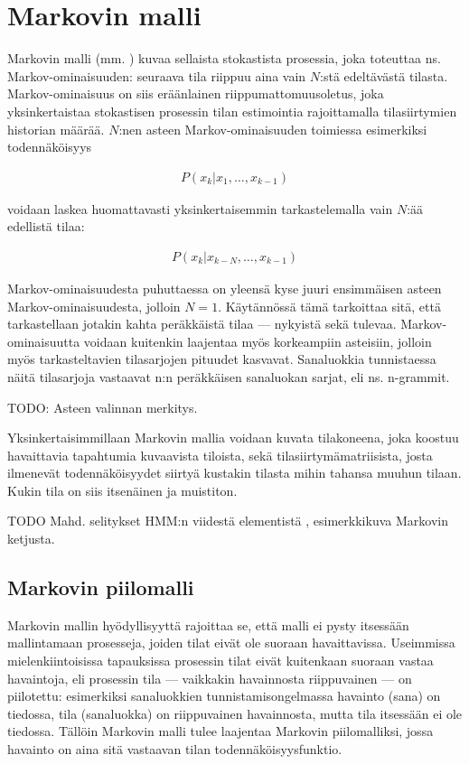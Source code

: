 \documentclass[utf8,bachelor,manualbib]{gradu3}
\begin{document}
\section{Markovin malli}

Markovin malli (mm. \citealp{rabiner1989}) kuvaa sellaista stokastista prosessia, joka toteuttaa ns. Markov-ominaisuuden: seuraava tila riippuu aina vain $N$:stä edeltävästä tilasta. Markov-ominaisuus on siis eräänlainen riippumattomuusoletus, joka yksinkertaistaa stokastisen prosessin tilan estimointia rajoittamalla tilasiirtymien historian määrää. $N$:nen asteen Markov-ominaisuuden toimiessa esimerkiksi todennäköisyys

\begin{align}
P(x_k | x_1, \ldots, x_{k-1})
\end{align}

voidaan laskea huomattavasti yksinkertaisemmin tarkastelemalla vain $N$:ää edellistä tilaa:

\begin{align}
P(x_k | x_{k - N }, \ldots, x_{k-1})
\end{align}

Markov-ominaisuudesta puhuttaessa on yleensä kyse juuri ensimmäisen asteen Markov-ominaisuudesta, jolloin $N=1$. Käytännössä tämä tarkoittaa sitä, että tarkastellaan jotakin kahta peräkkäistä tilaa --- nykyistä sekä tulevaa. Markov-ominaisuutta voidaan kuitenkin laajentaa myös korkeampiin asteisiin, jolloin myös tarkasteltavien tilasarjojen pituudet kasvavat. Sanaluokkia tunnistaessa näitä tilasarjoja vastaavat n:n peräkkäisen sanaluokan sarjat, eli ns. n-grammit.   

TODO: Asteen valinnan merkitys.

Yksinkertaisimmillaan Markovin mallia voidaan kuvata tilakoneena, joka koostuu havaittavia tapahtumia kuvaavista tiloista, sekä tilasiirtymämatriisista, josta ilmenevät todennäköisyydet siirtyä kustakin tilasta mihin tahansa muuhun tilaan. Kukin tila on siis itsenäinen ja muistiton.

TODO Mahd. selitykset HMM:n viidestä elementistä \citep{rabiner1989}, esimerkkikuva Markovin ketjusta.


\subsection{Markovin piilomalli}

Markovin mallin hyödyllisyyttä rajoittaa se, että malli ei pysty itsessään mallintamaan prosesseja, joiden tilat eivät ole suoraan havaittavissa. Useimmissa mielenkiintoisissa tapauksissa prosessin tilat eivät kuitenkaan suoraan vastaa havaintoja, eli prosessin tila --- vaikkakin havainnosta riippuvainen --- on piilotettu: esimerkiksi sanaluokkien tunnistamisongelmassa havainto (sana) on tiedossa, tila (sanaluokka) on riippuvainen havainnosta, mutta tila itsessään ei ole tiedossa. Tällöin Markovin malli tulee laajentaa Markovin piilomalliksi, jossa havainto on aina sitä vastaavan tilan todennäköisyysfunktio.
\end{document}
